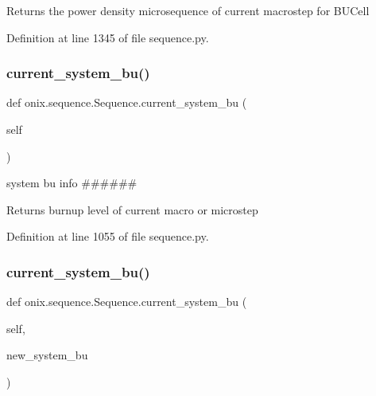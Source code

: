 \begin{DoxyVerb}Returns the power density microsequence of current macrostep
for BUCell\end{DoxyVerb}
 

Definition at line 1345 of file sequence.\+py.

\mbox{\label{classonix_1_1sequence_1_1Sequence_a6c98046f77413da7f3f0d77b5341aaf4}} 
\subsubsection{\texorpdfstring{current\+\_\+system\+\_\+bu()}{current\_system\_bu()}\hspace{0.1cm}{\footnotesize\ttfamily [1/2]}}
{\footnotesize\ttfamily def onix.\+sequence.\+Sequence.\+current\+\_\+system\+\_\+bu (\begin{DoxyParamCaption}\item[{}]{self }\end{DoxyParamCaption})}



system bu info \#\#\#\#\#\# 

\begin{DoxyVerb}Returns burnup level of current macro or microstep
\end{DoxyVerb}
 

Definition at line 1055 of file sequence.\+py.

\mbox{\label{classonix_1_1sequence_1_1Sequence_af203be1b2457e37f2df77ff79cbef53b}} 
\subsubsection{\texorpdfstring{current\+\_\+system\+\_\+bu()}{current\_system\_bu()}\hspace{0.1cm}{\footnotesize\ttfamily [2/2]}}
{\footnotesize\ttfamily def onix.\+sequence.\+Sequence.\+current\+\_\+system\+\_\+bu (\begin{DoxyParamCaption}\item[{}]{self,  }\item[{}]{new\+\_\+system\+\_\+bu }\end{DoxyParamCaption})}

